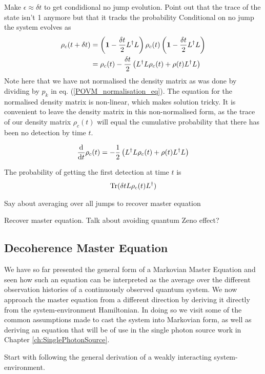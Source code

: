 Make $\epsilon \approx \delta t$ to get condidional no jump evolution. Point out that the trace of the state isn't 1 anymore but that it tracks the probability
Conditional on no jump the system evolves as
\begin{align}
  \rho_c(t+\delta t) &= \left(\mathbf{1} - \frac{\delta t}{2} L^\dagger L\right)\rho_c(t)\left(\mathbf{1} - \frac{\delta t}{2} L^\dagger L\right) \\
  &= \rho_c(t) - \frac{\delta t}{2} \left(L^\dagger L \rho_c(t) + \rho(t) L^\dagger L \right)
\end{align}
Note here that we have not normalised the density matrix as was done by dividing by $p_k$ in eq. (\ref{POVM_normalisation_eq}). The equation for the normalised density matrix is non-linear, which makes solution tricky. It is convenient to leave the density matrix in this non-normalised form, as the trace of our density matrix $\rho_c(t)$ will equal the cumulative probability that there has been no detection by time $t$.

\begin{align}
  \frac{\mathrm{d}}{\mathrm{d}t} \rho_c(t) = - \frac{1}{2} \left(L^\dagger L \rho_c(t) + \rho(t) L^\dagger L \right)
\end{align}

The probability of getting the first detection at time $t$ is 
\begin{align}
 \operatorname{Tr}(\delta t L \rho_c(t) L^\dagger)
\end{align}


Say about averaging over all jumps to recover master equation

Recover master equation. Talk about avoiding quantum Zeno effect? 


\subsection{Decoherence Master Equation}

We have so far presented the general form of a Markovian Master Equation and seen how such an equation can be interpreted as the average over the different observation histories of a continuously observed quantum system. We now approach the master equation from a different direction by deriving it directly from the system-environment Hamiltonian. In doing so we visit some of the common assumptions made to cast the system into Markovian form, as well as deriving an equation that will be of use in the single photon source work in Chapter \ref{ch:SinglePhotonSource}.

Start with following the general derivation of a weakly interacting system-environment.

